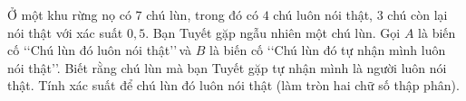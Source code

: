 \begin{ex}%
	Ở một khu rừng nọ có $7$ chú lùn, trong đó có $4$ chú luôn nói thật, $3$ chú còn lại nói thật với xác suất $0{,}5$. Bạn Tuyết gặp ngẫu nhiên một chú lùn. Gọi $A$ là biến cố \lq\lq  Chú lùn đó luôn nói thật\rq\rq\,và $B$ là biến cố \lq\lq  Chú lùn đó tự nhận mình luôn nói thật\rq\rq. Biết rằng chú lùn mà bạn Tuyết gặp tự nhận mình là người luôn nói thật. Tính xác suất để chú lùn đó luôn nói thật (làm tròn hai chữ số thập phân).
\end{ex}
